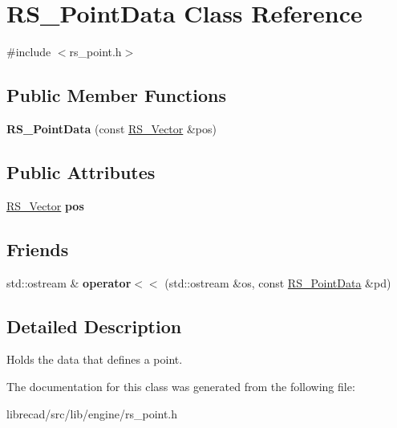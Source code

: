 \hypertarget{classRS__PointData}{\section{R\-S\-\_\-\-Point\-Data Class Reference}
\label{classRS__PointData}
}


{\ttfamily \#include $<$rs\-\_\-point.\-h$>$}

\subsection*{Public Member Functions}
\begin{DoxyCompactItemize}
\item 
\hypertarget{classRS__PointData_aba6a070bda34d92086772103b6b8f7d6}{{\bfseries R\-S\-\_\-\-Point\-Data} (const \hyperlink{classRS__Vector}{R\-S\-\_\-\-Vector} \&pos)}\label{classRS__PointData_aba6a070bda34d92086772103b6b8f7d6}

\end{DoxyCompactItemize}
\subsection*{Public Attributes}
\begin{DoxyCompactItemize}
\item 
\hypertarget{classRS__PointData_a796412da2eeb8802f47f9d502fa505b6}{\hyperlink{classRS__Vector}{R\-S\-\_\-\-Vector} {\bfseries pos}}\label{classRS__PointData_a796412da2eeb8802f47f9d502fa505b6}

\end{DoxyCompactItemize}
\subsection*{Friends}
\begin{DoxyCompactItemize}
\item 
\hypertarget{classRS__PointData_a5fa435b2a08caf30b6a624ceddf62924}{std\-::ostream \& {\bfseries operator$<$$<$} (std\-::ostream \&os, const \hyperlink{classRS__PointData}{R\-S\-\_\-\-Point\-Data} \&pd)}\label{classRS__PointData_a5fa435b2a08caf30b6a624ceddf62924}

\end{DoxyCompactItemize}


\subsection{Detailed Description}
Holds the data that defines a point. 

The documentation for this class was generated from the following file\-:\begin{DoxyCompactItemize}
\item 
librecad/src/lib/engine/rs\-\_\-point.\-h\end{DoxyCompactItemize}
